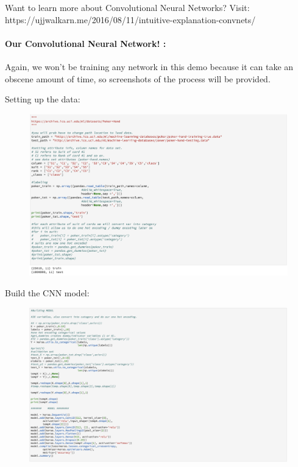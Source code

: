 \documentclass[11pt]{article}
\makeatletter
\def\maxwidth{\ifdim\Gin@nat@width>\linewidth\linewidth
    \else\Gin@nat@width\fi}
\let\Oldincludegraphics\includegraphics
\renewcommand{\includegraphics}[1]{\Oldincludegraphics[width=.8\maxwidth]{#1}}
\makeatother
\begin{document}
Want to learn more about Convolutional Neural Networks? Visit:
https://ujjwalkarn.me/2016/08/11/intuitive-explanation-convnets/

    \paragraph{Our Convolutional Neural Network!
:}\label{our-convolutional-neural-network}

    Again, we won't be training any network in this demo because it can take
an obscene amount of time, so screenshots of the process will be
provided.

    Setting up the data:

    \begin{figure}[htbp]
\centering
\includegraphics{setup_data_CNN-V2.png}
\caption{}
\end{figure}

    Build the CNN model:

    \begin{figure}[htbp]
\centering
\includegraphics{build_CNN_model-V2.png}
\caption{}
\end{figure}
\end{document}
